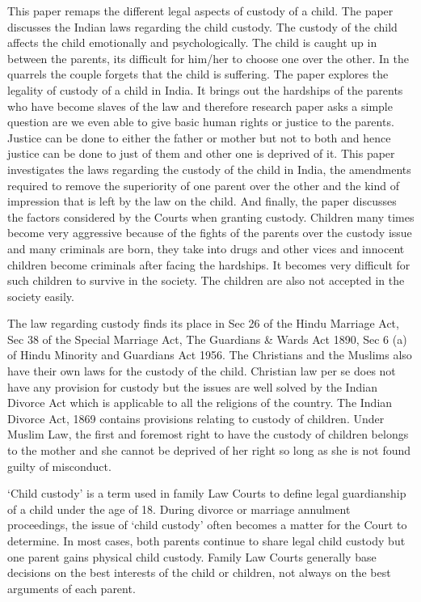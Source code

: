 \begin{multicols}{2}

\noi
This paper remaps the different legal aspects of custody of a child. The paper discusses the Indian
laws regarding the child custody. The custody of the child affects the child emotionally and
psychologically. The child is caught up in between the parents, its difficult for him/her to choose
one over the other. In the quarrels the couple forgets that the child is suffering. The paper explores
the legality of custody of a child in India. It brings out the hardships of the parents who have
become slaves of the law and therefore research paper asks a simple question are we even able to
give basic human rights or justice to the parents. Justice can be done to either the father or mother
but not to both and hence justice can be done to just of them and other one is deprived of it. This
paper investigates the laws regarding the custody of the child in India, the amendments required
to remove the superiority of one parent over the other and the kind of impression that is left by
the law on the child. And finally, the paper discusses the factors considered by the Courts when
granting custody. Children many times become very aggressive because of the fights of the
parents over the custody issue and many criminals are born, they take into drugs and other vices
and innocent children become criminals after facing the hardships. It becomes very difficult for
such children to survive in the society. The children are also not accepted in the society easily.

\noi
The law regarding custody finds its place in Sec 26 of the Hindu Marriage Act, Sec 38 of the
Special Marriage Act, The Guardians \& Wards Act 1890, Sec 6 (a) of Hindu Minority and
Guardians Act 1956. The Christians and the Muslims also have their own laws for the custody of
the child. Christian law per se does not have any provision for custody but the issues are well
solved by the Indian Divorce Act which is applicable to all the religions of the country. The Indian
Divorce Act, 1869 contains provisions relating to custody of children. Under Muslim Law, the
first and foremost right to have the custody of children belongs to the mother and she cannot be
deprived of her right so long as she is not found guilty of misconduct.

\noi
‘Child custody’ is a term used in family Law Courts to define legal guardianship of a child under
the age of 18. During divorce or marriage annulment proceedings, the issue of ‘child custody’ often becomes a matter for the Court to determine. In most cases, both parents continue to share
legal child custody but one parent gains physical child custody. Family Law Courts generally
base decisions on the best interests of the child or children, not always on the best arguments of
each parent.


\end{multicols}
